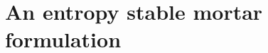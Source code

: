 \documentclass{svjour3}                     %
\begin{document}
%

%

\section{An entropy stable mortar formulation}
\label{sec:3}
\end{document}
